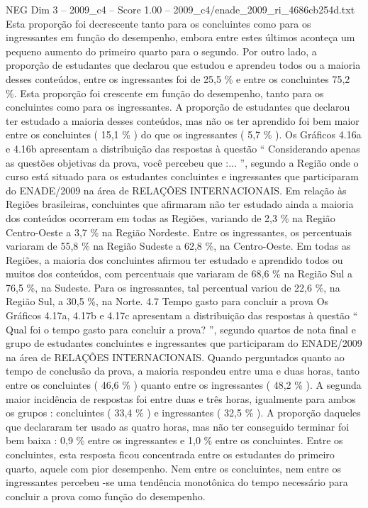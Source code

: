 \begin{textsample}{NEG Dim 3 – 2009\_c4 – Score 1.00 – 2009\_c4/enade\_2009\_ri\_4686cb254d.txt}
Esta proporção foi decrescente tanto para os concluintes como para os ingressantes em função do desempenho, embora entre estes últimos aconteça um pequeno aumento do primeiro quarto para o segundo.
Por outro lado, a proporção de estudantes que declarou que estudou e aprendeu todos ou a maioria desses conteúdos, entre os ingressantes foi de 25,5 \% e entre os concluintes 75,2 \%.
Esta proporção foi crescente em função do desempenho, tanto para os concluintes como para os ingressantes.
A proporção de estudantes que declarou ter estudado a maioria desses conteúdos, mas não os ter aprendido foi bem maior entre os concluintes ( 15,1 \% ) do que os ingressantes ( 5,7 \% ).
Os Gráficos 4.16a e 4.16b apresentam a distribuição das respostas à questão “ Considerando apenas as questões objetivas da prova, você percebeu que :... ”, segundo a Região onde o curso está situado para os estudantes concluintes e ingressantes que participaram do ENADE/2009 na área de RELAÇÕES INTERNACIONAIS.
Em relação às Regiões brasileiras, concluintes que afirmaram não ter estudado ainda a maioria dos conteúdos ocorreram em todas as Regiões, variando de 2,3 \% na Região Centro-Oeste a 3,7 \% na Região Nordeste.
Entre os ingressantes, os percentuais variaram de 55,8 \% na Região Sudeste a 62,8 \%, na Centro-Oeste.
Em todas as Regiões, a maioria dos concluintes afirmou ter estudado e aprendido todos ou muitos dos conteúdos, com percentuais que variaram de 68,6 \% na Região Sul a 76,5 \%, na Sudeste.
Para os ingressantes, tal percentual variou de 22,6 \%, na Região Sul, a 30,5 \%, na Norte. 4.7 Tempo gasto para concluir a prova Os Gráficos 4.17a, 4.17b e 4.17c apresentam a distribuição das respostas à questão “ Qual foi o tempo gasto para concluir a prova? ”, segundo quartos de nota final e grupo de estudantes concluintes e ingressantes que participaram do ENADE/2009 na área de RELAÇÕES INTERNACIONAIS.
Quando perguntados quanto ao tempo de conclusão da prova, a maioria respondeu entre uma e duas horas, tanto entre os concluintes ( 46,6 \% ) quanto entre os ingressantes ( 48,2 \% ).
A segunda maior incidência de respostas foi entre duas e três horas, igualmente para ambos os grupos : concluintes ( 33,4 \% ) e ingressantes ( 32,5 \% ).
A proporção daqueles que declararam ter usado as quatro horas, mas não ter conseguido terminar foi bem baixa : 0,9 \% entre os ingressantes e 1,0 \% entre os concluintes.
Entre os concluintes, esta resposta ficou concentrada entre os estudantes do primeiro quarto, aquele com pior desempenho.
Nem entre os concluintes, nem entre os ingressantes percebeu -se uma tendência monotônica do tempo necessário para concluir a prova como função do desempenho.

\end{textsample}
